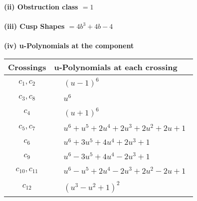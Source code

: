 \documentclass[1p]{elsarticle_modified}
\theoremstyle{definition}
\begin{document}
\flushleft \textbf{(ii) Obstruction class $= 1$}\\~\\
\flushleft \textbf{(iii) Cusp Shapes $= 4 b^3+4 b-4$}\\~\\
\newpage\renewcommand{\arraystretch}{1}
\flushleft \textbf{(iv) u-Polynomials at the component}\newline \\
\begin{tabular}{m{50pt}|m{274pt}}
Crossings & \hspace{64pt}u-Polynomials at each crossing \\
\hline $$\begin{aligned}c_{1},c_{2}\end{aligned}$$&$\begin{aligned}
&(u-1)^6
\end{aligned}$\\
\hline $$\begin{aligned}c_{3},c_{8}\end{aligned}$$&$\begin{aligned}
&u^6
\end{aligned}$\\
\hline $$\begin{aligned}c_{4}\end{aligned}$$&$\begin{aligned}
&(u+1)^6
\end{aligned}$\\
\hline $$\begin{aligned}c_{5},c_{7}\end{aligned}$$&$\begin{aligned}
&u^6+u^5+2 u^4+2 u^3+2 u^2+2 u+1
\end{aligned}$\\
\hline $$\begin{aligned}c_{6}\end{aligned}$$&$\begin{aligned}
&u^6+3 u^5+4 u^4+2 u^3+1
\end{aligned}$\\
\hline $$\begin{aligned}c_{9}\end{aligned}$$&$\begin{aligned}
&u^6-3 u^5+4 u^4-2 u^3+1
\end{aligned}$\\
\hline $$\begin{aligned}c_{10},c_{11}\end{aligned}$$&$\begin{aligned}
&u^6- u^5+2 u^4-2 u^3+2 u^2-2 u+1
\end{aligned}$\\
\hline $$\begin{aligned}c_{12}\end{aligned}$$&$\begin{aligned}
&(u^3- u^2+1)^2
\end{aligned}$\\
\hline
\end{tabular}\\~\\
\end{document}
